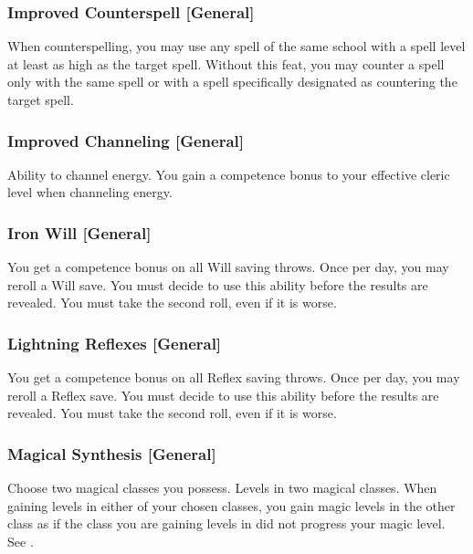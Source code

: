 
\subsubsection{Improved Counterspell [General]}
 When counterspelling, you may use any spell of the same school with a spell level at least as high as the target spell.
 Without this feat, you may counter a spell only with the same spell or with a spell specifically designated as countering the target spell.

\subsubsection{Improved Channeling [General]}
 Ability to channel energy.
 You gain a  competence bonus to your effective cleric level when channeling energy.

\subsubsection{Iron Will [General]}
 You get a  competence bonus on all Will saving throws. Once per day, you may reroll a Will save. You must decide to use this ability before the results are revealed. You must take the second roll, even if it is worse.

\subsubsection{Lightning Reflexes [General]}
 You get a  competence bonus on all Reflex saving throws. Once per day, you may reroll a Reflex save. You must decide to use this ability before the results are revealed. You must take the second roll, even if it is worse.

\subsubsection{Magical Synthesis [General]}
Choose two magical classes you possess.
 Levels in two magical classes.
 When gaining levels in either of your chosen classes, you gain magic levels in the other class as if the class you are gaining levels in did not progress your magic level. See .

